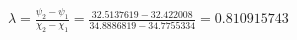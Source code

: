 \documentclass[amsart]{article}
\begin{document}
$\lambda=\frac{\psi_2-\psi_1}{\chi_2-\chi_1}=\frac{32.5137619-32.422008}{34.8886819-34.7755334}=0.810915743$
\end{document}

